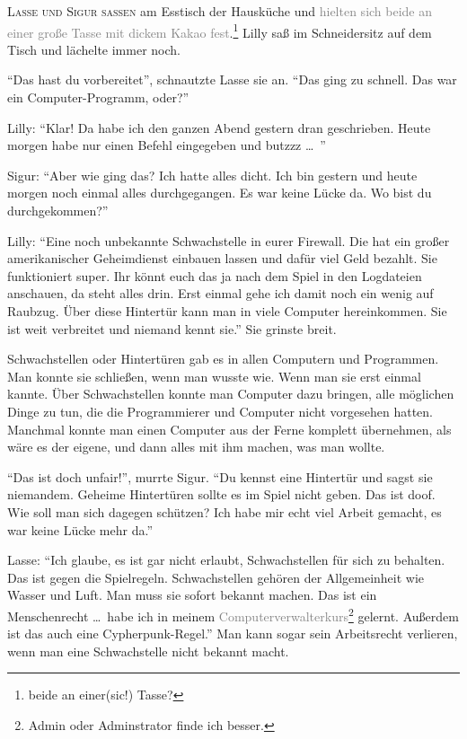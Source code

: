 \label{cha:schwachstellen_in_computern}

\textsc{Lasse und Sigur saßen} am Esstisch der Hausküche und \textcolor{gray}{hielten sich beide an einer große Tasse mit dickem Kakao fest}.\footnote{beide an einer(sic!) Tasse?}
Lilly saß im Schneidersitz auf dem Tisch und lächelte immer noch.

\enquote{Das hast du vorbereitet}, schnautzte Lasse sie an.
\enquote{Das ging zu schnell.
Das war ein Computer-Programm, oder?}

Lilly: \enquote{Klar! Da habe ich den ganzen Abend gestern dran geschrieben.
Heute morgen habe nur einen Befehl eingegeben und butzzz \dots\ }

Sigur: \enquote{Aber wie ging das? Ich hatte alles dicht.
Ich bin gestern und heute morgen noch einmal alles durchgegangen.
Es war keine Lücke da.
Wo bist du durchgekommen?}

Lilly: \enquote{Eine noch unbekannte Schwachstelle in eurer Firewall.
Die hat ein großer amerikanischer Geheimdienst einbauen lassen und dafür viel Geld bezahlt.
Sie funktioniert super.
Ihr könnt euch das ja nach dem Spiel in den Logdateien anschauen, da steht alles drin.
Erst einmal gehe ich damit noch ein wenig auf Raubzug.
Über diese Hintertür kann man in viele Computer hereinkommen.
Sie ist weit verbreitet und niemand kennt sie.} Sie grinste breit.

Schwachstellen oder Hintertüren gab es in allen Computern und Programmen.
Man konnte sie schließen, wenn man wusste wie.
Wenn man sie erst einmal kannte.
Über Schwachstellen konnte man Computer dazu bringen, alle möglichen Dinge zu tun, die die Programmierer und Computer nicht vorgesehen hatten.
Manchmal konnte man einen Computer aus der Ferne komplett übernehmen, als wäre es der eigene, und dann alles mit ihm machen, was man wollte.

\enquote{Das ist doch unfair!}, murrte Sigur.
\enquote{Du kennst eine Hintertür und sagst sie niemandem.
Geheime Hintertüren sollte es im Spiel nicht geben.
Das ist doof.
Wie soll man sich dagegen schützen? Ich habe mir echt viel Arbeit gemacht, es war keine Lücke mehr da.}

Lasse: \enquote{Ich glaube, es ist gar nicht erlaubt, Schwachstellen für sich zu behalten.
Das ist gegen die Spielregeln.
Schwachstellen gehören der Allgemeinheit wie Wasser und Luft.
Man muss sie sofort bekannt machen.
Das ist ein Menschenrecht \dots\  habe ich in meinem \textcolor{gray}{Computerverwalterkurs}\footnote{Admin oder Adminstrator finde ich besser.} gelernt.
Außerdem ist das auch eine Cypherpunk-Regel.} Man kann sogar sein Arbeitsrecht verlieren, wenn man eine Schwachstelle nicht bekannt macht.

